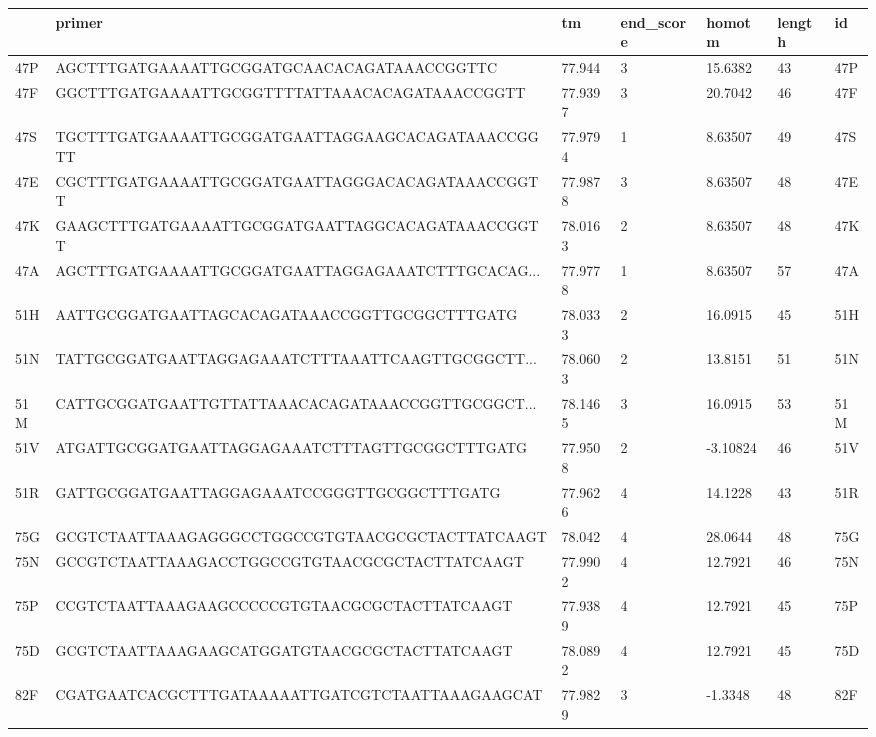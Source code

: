 \begin{tabular}{lllllll}
\toprule
{} &                                             primer &       tm & end\_score &    homotm & length &   id \\
\midrule
47P &        AGCTTTGATGAAAATTGCGGATGCAACACAGATAAACCGGTTC &   77.944 &         3 &   15.6382 &     43 &  47P \\
47F &     GGCTTTGATGAAAATTGCGGTTTTATTAAACACAGATAAACCGGTT &  77.9397 &         3 &   20.7042 &     46 &  47F \\
47S &  TGCTTTGATGAAAATTGCGGATGAATTAGGAAGCACAGATAAACCGGTT &  77.9794 &         1 &   8.63507 &     49 &  47S \\
47E &   CGCTTTGATGAAAATTGCGGATGAATTAGGGACACAGATAAACCGGTT &  77.9878 &         3 &   8.63507 &     48 &  47E \\
47K &   GAAGCTTTGATGAAAATTGCGGATGAATTAGGCACAGATAAACCGGTT &  78.0163 &         2 &   8.63507 &     48 &  47K \\
47A &  AGCTTTGATGAAAATTGCGGATGAATTAGGAGAAATCTTTGCACAG... &  77.9778 &         1 &   8.63507 &     57 &  47A \\
51H &      AATTGCGGATGAATTAGCACAGATAAACCGGTTGCGGCTTTGATG &  78.0333 &         2 &   16.0915 &     45 &  51H \\
51N &  TATTGCGGATGAATTAGGAGAAATCTTTAAATTCAAGTTGCGGCTT... &  78.0603 &         2 &   13.8151 &     51 &  51N \\
51M &  CATTGCGGATGAATTGTTATTAAACACAGATAAACCGGTTGCGGCT... &  78.1465 &         3 &   16.0915 &     53 &  51M \\
51V &     ATGATTGCGGATGAATTAGGAGAAATCTTTAGTTGCGGCTTTGATG &  77.9508 &         2 &  -3.10824 &     46 &  51V \\
51R &        GATTGCGGATGAATTAGGAGAAATCCGGGTTGCGGCTTTGATG &  77.9626 &         4 &   14.1228 &     43 &  51R \\
75G &   GCGTCTAATTAAAGAGGGCCTGGCCGTGTAACGCGCTACTTATCAAGT &   78.042 &         4 &   28.0644 &     48 &  75G \\
75N &     GCCGTCTAATTAAAGACCTGGCCGTGTAACGCGCTACTTATCAAGT &  77.9902 &         4 &   12.7921 &     46 &  75N \\
75P &      CCGTCTAATTAAAGAAGCCCCCGTGTAACGCGCTACTTATCAAGT &  77.9389 &         4 &   12.7921 &     45 &  75P \\
75D &      GCGTCTAATTAAAGAAGCATGGATGTAACGCGCTACTTATCAAGT &  78.0892 &         4 &   12.7921 &     45 &  75D \\
82F &   CGATGAATCACGCTTTGATAAAAATTGATCGTCTAATTAAAGAAGCAT &  77.9829 &         3 &   -1.3348 &     48 &  82F \\

\end{tabular}
